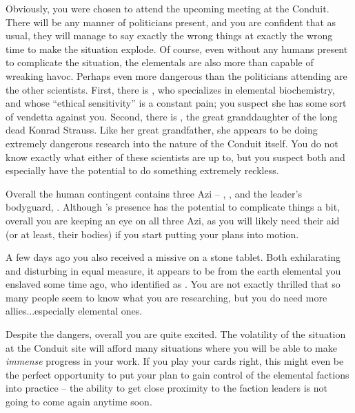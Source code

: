 \documentclass[char]{elementals}
\begin{document}
Obviously, you were chosen to attend the upcoming meeting at the Conduit. There will be any manner of politicians present, and you are confident that as usual, they will manage to say exactly the wrong things at exactly the wrong time to make the situation explode. Of course, even without any humans present to complicate the situation, the elementals are also more than capable of wreaking havoc. Perhaps even more dangerous than the politicians attending are the other scientists. First, there is \cScientist{}, who specializes in elemental biochemistry, and whose ``ethical sensitivity'' is a constant pain; you suspect she has some sort of vendetta against you. Second, there is \cGD{\intro}, the great granddaughter of the long dead Konrad Strauss. Like her great grandfather, she appears to be doing extremely dangerous research into the nature of the Conduit itself. You do not know exactly what either of these scientists are up to, but you suspect both \cScientist{} and especially \cGD{} have the potential to do something extremely reckless.

Overall the human contingent contains three Azi -- \cDiplomat{}, \cScientist{}, and the leader's bodyguard, \cRomeo{\intro}. Although \cDiplomat{}'s presence has the potential to complicate things a bit, overall you are keeping an eye on all three Azi, as you will likely need their aid (or at least, their bodies) if you start putting your plans into motion.

A few days ago you also received a missive on a stone tablet. Both exhilarating and disturbing in equal measure, it appears to be from the earth elemental you enslaved some time ago, who identified \cMinion{\themself} as \cMinion{\intro}. You are not exactly thrilled that so many people seem to know what you are researching, but you do need more allies...especially elemental ones.

Despite the dangers, overall you are quite excited. The volatility of the situation at the Conduit site will afford many situations where you will be able to make \emph{immense} progress in your work. If you play your cards right, this might even be the perfect opportunity to put your plan to gain control of the elemental factions into practice -- the ability to get close proximity to the faction leaders is not going to come again anytime soon.
\end{document}
